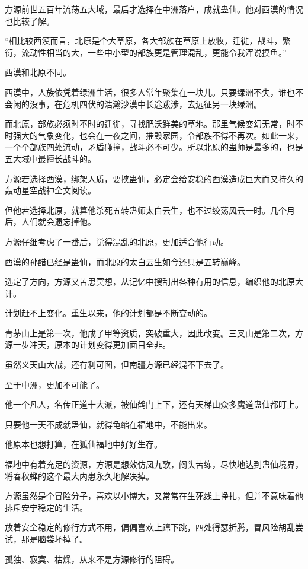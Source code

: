 \begin{this_body}
方源前世五百年流荡五大域，最后才选择在中洲落户，成就蛊仙。他对西漠的情况也比较了解。

“相比较西漠而言，北原是个大草原，各大部族在草原上放牧，迁徙，战斗，繁衍，流动性相当的大，一些中小型的部族更是管理混乱，更能令我浑说摸鱼。”

西漠和北原不同。

西漠中，人族依凭着绿洲生活，很多人常年聚集在一块儿。只要绿洲不失，谁也不会闲的没事，在危机四伏的浩瀚沙漠中长途跋涉，去远征另一块绿洲。

而北原，部族必须时不时的迁徙，寻找肥沃鲜美的草地。那里气候变幻无常，时不时强大的气象变化，也会在一夜之间，摧毁家园，令部族不得不再次。如此一来，一个个部族四处流动，矛盾碰撞，战斗必不可少。所以北原的蛊师是最多的，也是五大域中最擅长战斗的。

方源若选择西漠，绑架人质，要挟蛊仙，必定会给安稳的西漠造成巨大而又持久的轰动星空战神全文阅读。

但他若选择北原，就算他杀死五转蛊师太白云生，也不过绞荡风云一时。几个月后，人们就会遗忘掉他。

方源仔细考虑了一番后，觉得混乱的北原，更加适合他行动。

西漠的孙醋已经是蛊仙，而北原的太白云生如今还只是五转巅峰。

选定了方向，方源又苦思冥想，从记忆中搜刮出各种有用的信息，编织他的北原大计。

计划赶不上变化。重生以来，他的计划都是不断变动的。

青茅山上是第一次，他成了甲等资质，突破重大，因此改变。三叉山是第二次，方源一步冲天，原本的计划变得更加面目全非。

虽然义天山大战，还有利可图，但南疆方源已经混不下去了。

至于中洲，更加不可能了。

他一个凡人，名传正道十大派，被仙鹤门上下，还有天梯山众多魔道蛊仙都盯上。

只要他一天不成就蛊仙，就得龟缩在福地中，不能出来。

他原本也想打算，在狐仙福地中好好生存。

福地中有着充足的资源，方源是想效仿凤九歌，闷头苦练，尽快地达到蛊仙境界，将春秋蝉的这个最大内患永久地解决掉。

方源虽然是个冒险分子，喜欢以小博大，又常常在生死线上挣扎，但并不意味着他排斥安宁稳定的生活。

放着安全稳定的修行方式不用，偏偏喜欢上蹿下跳，四处得瑟折腾，冒风险胡乱尝试，那是脑袋坏掉了。

孤独、寂寞、枯燥，从来不是方源修行的阻碍。


\end{this_body}
